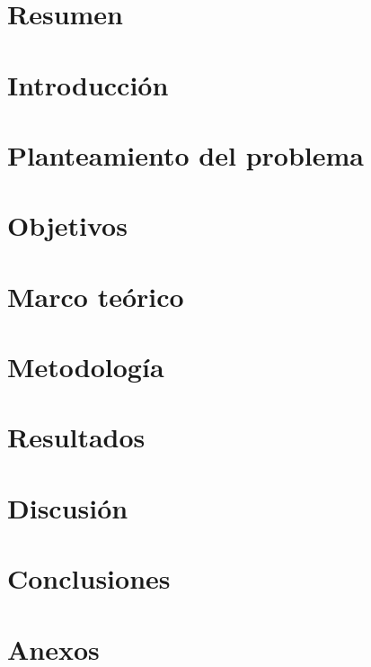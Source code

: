 \documentclass[11pt]{article}
\theoremstyle{mytheoremstyle}
\theoremstyle{mytheoremstyle}
\theoremstyle{myproblemstyle}
\begin{document}
\section{Resumen}
    

\section{Introducción}
    

\section{Planteamiento del problema}
    

\section{Objetivos}
    

\section{Marco teórico}
    

\section{Metodología}
    

\section{Resultados}
    

\section{Discusión}
    

\section{Conclusiones}
    

\clearpage
{}

\printbibliography

\clearpage
{} %

\section*{Anexos}

\end{document}
